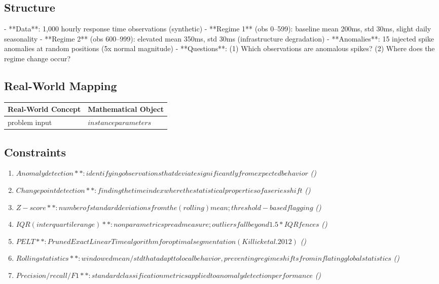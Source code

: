 \documentclass[11pt, a4paper]{article}
\begin{document}
\subsection{Structure}

- **Data**: 1,000 hourly response time observations (synthetic)
- **Regime 1** (obs 0--599): baseline mean 200ms, std 30ms, slight daily seasonality
- **Regime 2** (obs 600--999): elevated mean 350ms, std 30ms (infrastructure degradation)
- **Anomalies**: 15 injected spike anomalies at random positions (5x normal magnitude)
- **Questions**: (1) Which observations are anomalous spikes? (2) Where does the regime change occur?

\subsection{Real-World Mapping}

\begin{longtable}{ll}
\toprule
\textbf{Real-World Concept} & \textbf{Mathematical Object} \\
\midrule
\endhead
problem input & $instance parameters$ \\
\bottomrule
\end{longtable}

\subsection{Constraints}

\begin{enumerate}
  \item $Anomaly detection**: identifying observations that deviate significantly from expected behavior$
  \hfill \textit{()}
  \item $Change point detection**: finding the time index where the statistical properties of a series shift$
  \hfill \textit{()}
  \item $Z-score**: number of standard deviations from the (rolling) mean; threshold-based flagging$
  \hfill \textit{()}
  \item $IQR (interquartile range)**: nonparametric spread measure; outliers fall beyond 1.5*IQR fences$
  \hfill \textit{()}
  \item $PELT**: Pruned Exact Linear Time algorithm for optimal segmentation (Killick et al. 2012)$
  \hfill \textit{()}
  \item $Rolling statistics**: windowed mean/std that adapt to local behavior, preventing regime shifts from inflating global statistics$
  \hfill \textit{()}
  \item $Precision / recall / F1**: standard classification metrics applied to anomaly detection performance$
  \hfill \textit{()}
\end{enumerate}
\end{document}
